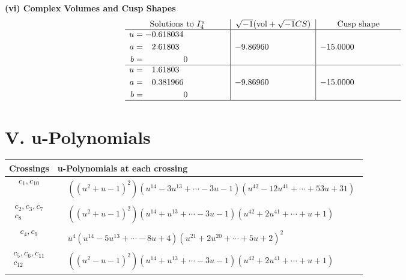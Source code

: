 \documentclass[1p]{elsarticle_modified}
\theoremstyle{definition}
\newcommand{\I}{\sqrt{-1}}
\begin{document}
\newpage\flushleft \textbf{(vi) Complex Volumes and Cusp Shapes}
$$\begin{array}{c|c|c}  
\text{Solutions to }I^u_{4}& \I (\text{vol} + \sqrt{-1}CS) & \text{Cusp shape}\\
 \hline 
\begin{aligned}
u &= -0.618034\phantom{ +0.000000I} \\
a &= \phantom{-}2.61803\phantom{ +0.000000I} \\
b &= \phantom{-0.000000 } 0\end{aligned}
 & -9.86960\phantom{ +0.000000I} & -15.0000\phantom{ +0.000000I} \\ \hline\begin{aligned}
u &= \phantom{-}1.61803\phantom{ +0.000000I} \\
a &= \phantom{-}0.381966\phantom{ +0.000000I} \\
b &= \phantom{-0.000000 } 0\end{aligned}
 & -9.86960\phantom{ +0.000000I} & -15.0000\phantom{ +0.000000I}\\
 \hline 
 \end{array}$$\newpage
\newpage\renewcommand{\arraystretch}{1}
\centering \section*{ V. u-Polynomials}
\begin{tabular}{m{50pt}|m{274pt}}
Crossings & \hspace{64pt}u-Polynomials at each crossing \\
\hline $$\begin{aligned}c_{1},c_{10}\end{aligned}$$&$\begin{aligned}
&((u^2+u-1)^2)(u^{14}-3 u^{13}+\cdots-3 u-1)(u^{42}-12 u^{41}+\cdots+53 u+31)
\end{aligned}$\\
\hline $$\begin{aligned}c_{2},c_{3},c_{7}\\c_{8}\end{aligned}$$&$\begin{aligned}
&((u^2+u-1)^2)(u^{14}+u^{13}+\cdots-3 u-1)(u^{42}+2 u^{41}+\cdots+u+1)
\end{aligned}$\\
\hline $$\begin{aligned}c_{4},c_{9}\end{aligned}$$&$\begin{aligned}
&u^4(u^{14}-5 u^{13}+\cdots-8 u+4)(u^{21}+2 u^{20}+\cdots+5 u+2)^{2}
\end{aligned}$\\
\hline $$\begin{aligned}c_{5},c_{6},c_{11}\\c_{12}\end{aligned}$$&$\begin{aligned}
&((u^2- u-1)^2)(u^{14}+u^{13}+\cdots-3 u-1)(u^{42}+2 u^{41}+\cdots+u+1)
\end{aligned}$\\
\hline
\end{tabular}\newpage\renewcommand{\arraystretch}{1}
\end{document}
